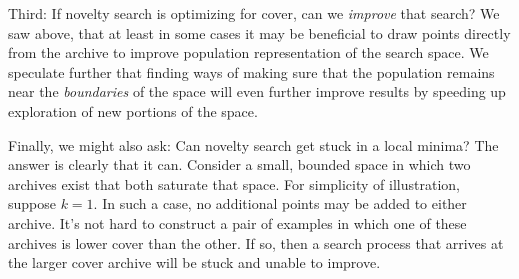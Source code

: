 \documentclass[twoside]{article}
\begin{document}
Third: If novelty search is optimizing for cover, can we \emph{improve} that search?  We saw above, that at least in some cases it may be beneficial to draw points directly from the archive to improve population representation of the search space.  We speculate further that finding ways of making sure that the population remains near the \emph{boundaries} of the space will even further improve results by speeding up exploration of new portions of the space.

Finally, we might also ask:  Can novelty search get stuck in a local minima?  The answer is clearly that it can.  Consider a small, bounded space in which two archives exist that both saturate that space.  For simplicity of illustration, suppose $k=1$.  In such a case, no additional points may be added to either archive.  It's not hard to construct a pair of examples in which one of these archives is lower cover than the other.  If so, then a search process that arrives at the larger cover archive will be stuck and unable to improve.  
\end{document}
